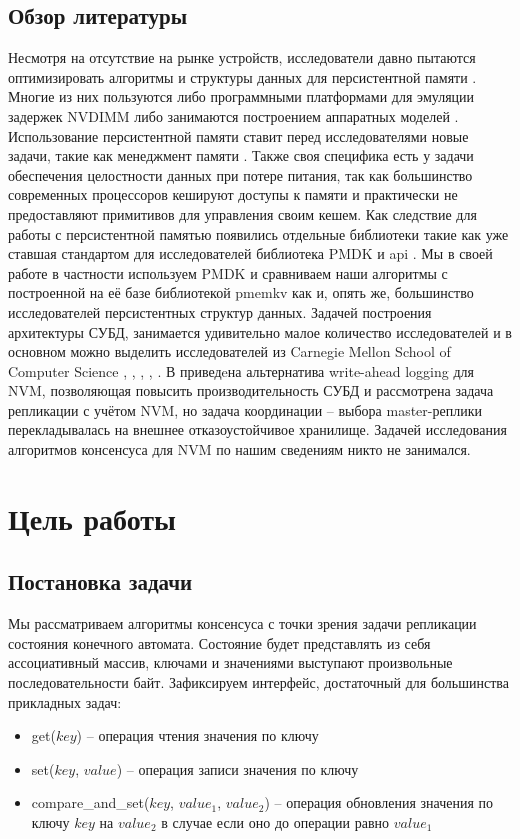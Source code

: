 \documentclass[pdftex,ptm,12pt,a4paper]{report}
\theoremstyle{definition}
\begin{document}
\section{Обзор литературы}
Несмотря на отсутствие на рынке устройств, исследователи давно пытаются оптимизировать алгоритмы \cite{iwabuchi2014nvm} и структуры данных \cite{chen2015persistent} для персистентной памяти .
Многие из них пользуются либо программными платформами для эмуляции задержек NVDIMM \cite{sengupta2015framework} либо занимаются построением аппаратных моделей \cite{dong2012nvsim}.
Использование персистентной памяти ставит перед исследователями новые задачи, такие как менеджмент памяти \cite{schwalb2015nvm}. Также своя специфика есть у задачи обеспечения
целостности данных при потере питания, так как большинство современных процессоров кешируют доступы к памяти и практически не предоставляют примитивов для управления своим кешем.
Как следствие для работы с персистентной памятью появились отдельные библиотеки такие как уже ставшая стандартом для исследователей библиотека PMDK \cite{pmdk}
и api \cite{kolli2016delegated}.  Мы в своей работе в частности используем PMDK и сравниваем наши алгоритмы с построенной на её базе библиотекой pmemkv \cite{pmemkv} как и, опять же,
большинство исследователей персистентных структур данных.
Задачей построения архитектуры СУБД, занимается удивительно малое количество исследователей и в основном можно выделить исследователей из Carnegie Mellon School of Computer Science
\cite{pavlo17}, \cite{arulraj2015let}, \cite{debrabant2014prolegomenon}, \cite{arulraj2017build}, \cite{writebehind}.  В \cite{writebehind} приведeна альтернатива write-ahead logging
для NVM, позволяющая повысить производительность СУБД и рассмотрена задача репликации с учётом NVM, но задача координации -- выбора master-реплики перекладывалась на внешнее отказоустойчивое хранилище.
Задачей исследования алгоритмов консенсуса для NVM по нашим сведениям никто не занимался.

\chapter{Цель работы}
\section{Постановка задачи}
Мы рассматриваем алгоритмы консенсуса с точки зрения задачи репликации состояния конечного автомата. Состояние будет представлять из себя ассоциативный массив, ключами и значениями
выступают произвольные последовательности байт. Зафиксируем интерфейс, достаточный для большинства прикладных задач:
\begin{itemize}
    \item get($key$) -- операция чтения значения по ключу
    \item set($key$, $value$) -- операция записи значения по ключу
    \item compare\_and\_set($key$, $value_1$, $value_2$) -- операция обновления значения по ключу $key$ на $value_2$ в случае если оно до операции равно $value_1$
\end{itemize}
\end{document}
